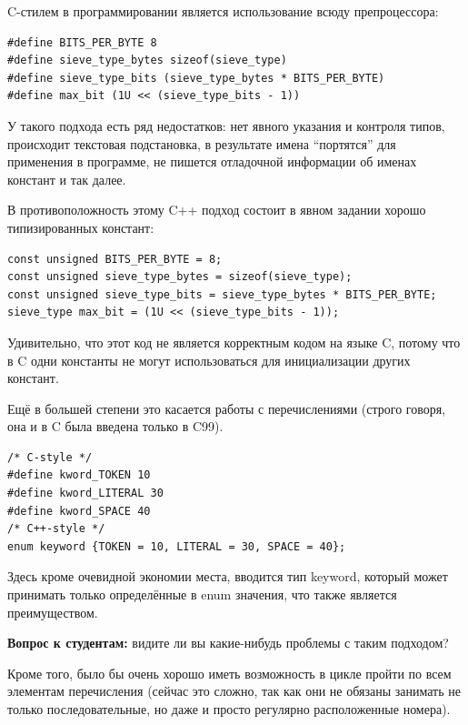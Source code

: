 \documentclass[a4paper,12pt,oneside]{article}
\newif\ifanswers
\begin{document}
C-стилем в программировании является использование всюду препроцессора:

\begin{lstlisting}
#define BITS_PER_BYTE 8
#define sieve_type_bytes sizeof(sieve_type)
#define sieve_type_bits (sieve_type_bytes * BITS_PER_BYTE)
#define max_bit (1U << (sieve_type_bits - 1))
\end{lstlisting}

У такого подхода есть ряд недостатков: нет явного указания и контроля типов, происходит текстовая подстановка, в результате имена ``портятся'' для применения в программе, не пишется отладочной информации об именах констант и так далее.

В противоположность этому C++ подход состоит в явном задании хорошо типизированных констант:

\begin{lstlisting}
const unsigned BITS_PER_BYTE = 8;
const unsigned sieve_type_bytes = sizeof(sieve_type);
const unsigned sieve_type_bits = sieve_type_bytes * BITS_PER_BYTE;
sieve_type max_bit = (1U << (sieve_type_bits - 1));
\end{lstlisting}

Удивительно, что этот код не является корректным кодом на языке C, потому что в C одни константы не могут использоваться для инициализации других констант.

Ещё в большей степени это касается работы с перечислениями (строго говоря, она и в C была введена только в C99).

\begin{lstlisting}
/* C-style */
#define kword_TOKEN 10
#define kword_LITERAL 30
#define kword_SPACE 40
/* C++-style */
enum keyword {TOKEN = 10, LITERAL = 30, SPACE = 40};
\end{lstlisting}

Здесь кроме очевидной экономии места, вводится тип keyword, который может принимать только определённые в enum значения, что также является преимуществом.

\textbf{Вопрос к студентам:} видите ли вы какие-нибудь проблемы с таким подходом?

\ifanswers
Возможный ответ: да, символьное имя \lstinline!TOKEN! может конфликтовать с другим перечислением.
\fi

Кроме того, было бы очень хорошо иметь возможность в цикле пройти по всем элементам перечисления (сейчас это сложно, так как они не обязаны занимать не только последовательные, но даже и просто регулярно расположенные номера).
\end{document}
